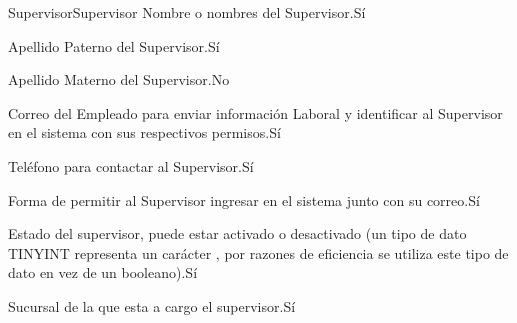 \begin{cdtEntidad}{Supervisor}{Supervisor}
		{Nombre o nombres del Supervisor.}{Sí}
		
		{Apellido Paterno del Supervisor.}{Sí}
		
		{Apellido Materno del Supervisor.}{No}
		
		{Correo del Empleado para enviar información Laboral y identificar al Supervisor en el sistema con sus respectivos permisos.}{Sí}

		{Teléfono para contactar al Supervisor.}{Sí}
		
		{Forma de permitir al Supervisor ingresar en el sistema junto con su correo.}{Sí}
		
		{Estado del supervisor, puede estar activado o desactivado (un tipo de dato TINYINT representa un carácter , por razones de eficiencia se utiliza este tipo de dato en vez de un booleano).}{Sí}	
	
		{Sucursal de la que esta a cargo el supervisor.}{Sí}

		\cdtEntityRelSection
\end{cdtEntidad}




